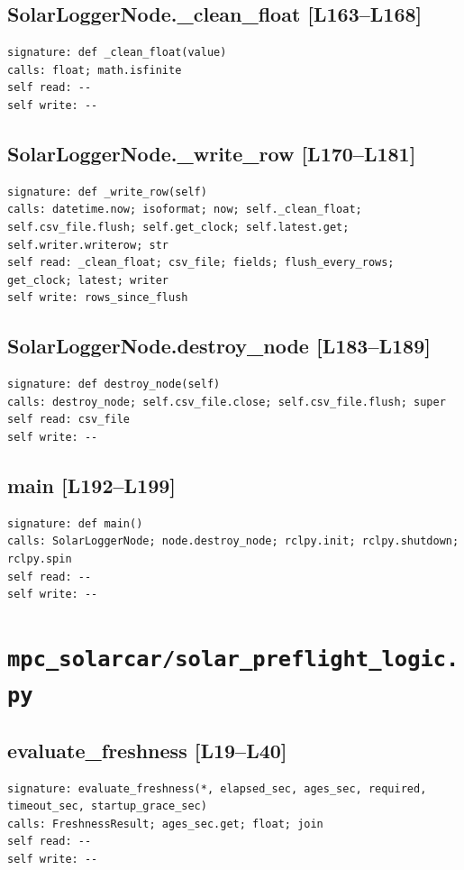 \documentclass[a4paper,10pt,oneside]{book}
\begin{document}
\subsection*{SolarLoggerNode.\_clean\_float [L163--L168]}
\begin{lstlisting}[numbers=none]
signature: def _clean_float(value)
calls: float; math.isfinite
self read: --
self write: --
\end{lstlisting}
\subsection*{SolarLoggerNode.\_write\_row [L170--L181]}
\begin{lstlisting}[numbers=none]
signature: def _write_row(self)
calls: datetime.now; isoformat; now; self._clean_float; self.csv_file.flush; self.get_clock; self.latest.get; self.writer.writerow; str
self read: _clean_float; csv_file; fields; flush_every_rows; get_clock; latest; writer
self write: rows_since_flush
\end{lstlisting}
\subsection*{SolarLoggerNode.destroy\_node [L183--L189]}
\begin{lstlisting}[numbers=none]
signature: def destroy_node(self)
calls: destroy_node; self.csv_file.close; self.csv_file.flush; super
self read: csv_file
self write: --
\end{lstlisting}
\subsection*{main [L192--L199]}
\begin{lstlisting}[numbers=none]
signature: def main()
calls: SolarLoggerNode; node.destroy_node; rclpy.init; rclpy.shutdown; rclpy.spin
self read: --
self write: --
\end{lstlisting}
\section{\texttt{mpc\_solarcar/solar\_preflight\_logic.py}}
\subsection*{evaluate\_freshness [L19--L40]}
\begin{lstlisting}[numbers=none]
signature: evaluate_freshness(*, elapsed_sec, ages_sec, required, timeout_sec, startup_grace_sec)
calls: FreshnessResult; ages_sec.get; float; join
self read: --
self write: --
\end{lstlisting}
\end{document}
